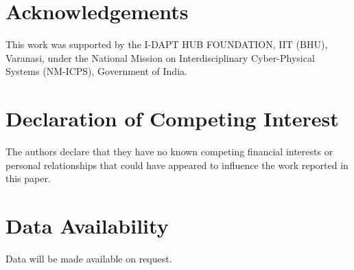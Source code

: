 \documentclass[journal]{IEEEtran}
\begin{document}
\section*{Acknowledgements}

This work was supported by the I-DAPT HUB FOUNDATION,
IIT (BHU), Varanasi, under the National Mission on
Interdisciplinary Cyber-Physical Systems (NM-ICPS),
Government of India.

\section*{Declaration of Competing Interest}

The authors declare that they have no known competing
financial interests or personal relationships that could
have appeared to influence the work reported in this paper.

\section*{Data Availability}

Data will be made available on request.

\FloatBarrier





\end{document}
